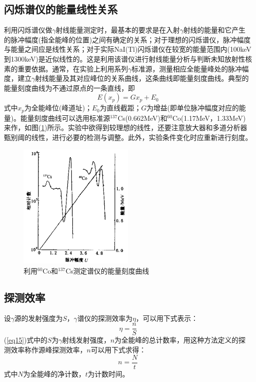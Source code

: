 \documentclass[a4paper]{article}
\begin{document}
\subsection{闪烁谱仪的能量线性关系}
利用闪烁谱仪做$\gamma$射线能量测定时，最基本的要求是在入射$\gamma$射线的能量和它产生的脉冲幅度(指全能峰的位置)之间有确定的关系；对于理想的闪烁谱仪，脉冲幅度与能量之间应是线性关系；对于实际NaI(Tl)闪烁谱仪在较宽的能量范围内(100keV到1300keV)是近似线性的。这是利用该谱仪进行射线能量分析与判断未知放射性核素的重要依据。通常，在实验上利用系列$\gamma$标准源，测量相应全能量峰处的脉冲幅度，建立$\gamma$射线能量及其对应峰位的关系曲线，这条曲线即能量刻度曲线。典型的能量刻度曲线为不通过原点的一条直线，即
\begin{equation}
E(x_p) = Gx_p + E_0\label{eq14}
\end{equation}
式中$x_p$为全能峰位(峰道址)；$E_0$为直线截距；$G$为增益(即单位脉冲幅度对应的能量)。能量刻度曲线可以选用标准源$^{137}$Cs(0.662MeV)和$^{60}$Co(1.17MeV，1.33MeV)来作，如图(\ref{fig7})所示。实验中欲得到较理想的线性，还要注意放大器和多道分析器甄别阈的线性，进行必要的检测与调整。此外，实验条件变化时应重新进行刻度。
\begin{figure}[!h]
	\centering
	\includegraphics[width=0.5\textwidth]{fig/fig7.pdf}
	\caption{利用$^{60}$Co和$^{137}$Cs测定谱仪的能量刻度曲线}\label{fig7}
\end{figure}

\subsection{探测效率}
设$\gamma$源的发射强度为$S$，$\gamma$谱仪的探测效率为$\eta$，可以用下式表示：
\begin{equation}
\eta = \frac{n}{S}\label{eq15}
\end{equation}
(\ref{eq15})式中的$S$为$\gamma$射线发射强度，$n$为全能峰的总计数率，用这种方法定义的探测效率称作源峰探测效率，$n$可以用下式求得：
\begin{equation}
n = \frac{N}{t}\label{eq16}
\end{equation}
式中$N$为全能峰的净计数，$t$为计数时间。
\end{document}
